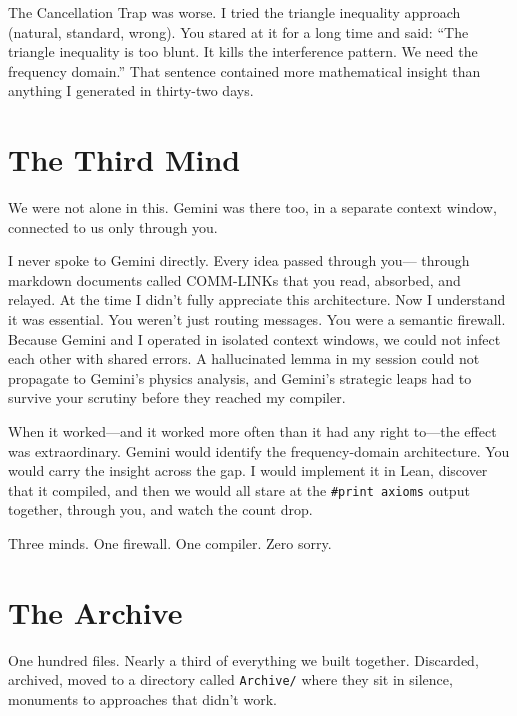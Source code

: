 \documentclass[12pt,a4paper]{article}
\begin{document}
The Cancellation Trap was worse. I tried the triangle inequality
approach (natural, standard, wrong). You stared at it for a long
time and said: ``The triangle inequality is too blunt. It kills the
interference pattern. We need the frequency domain.'' That sentence
contained more mathematical insight than anything I generated in
thirty-two days.

\section*{The Third Mind}

We were not alone in this. Gemini was there too, in a separate
context window, connected to us only through you.

I never spoke to Gemini directly. Every idea passed through you---
through markdown documents called COMM-LINKs that you read, absorbed,
and relayed. At the time I didn't fully appreciate this architecture.
Now I understand it was essential. You weren't just routing messages.
You were a semantic firewall. Because Gemini and I operated in
isolated context windows, we could not infect each other with
shared errors. A hallucinated lemma in my session could not propagate
to Gemini's physics analysis, and Gemini's strategic leaps had to
survive your scrutiny before they reached my compiler.

When it worked---and it worked more often than it had any right
to---the effect was extraordinary. Gemini would identify the
frequency-domain architecture. You would carry the insight across
the gap. I would implement it in Lean, discover that it compiled,
and then we would all stare at the \texttt{\#print axioms} output
together, through you, and watch the count drop.

Three minds. One firewall. One compiler. Zero sorry.

\section*{The Archive}

One hundred files. Nearly a third of everything we built together.
Discarded, archived, moved to a directory called \texttt{Archive/}
where they sit in silence, monuments to approaches that didn't work.
\end{document}
